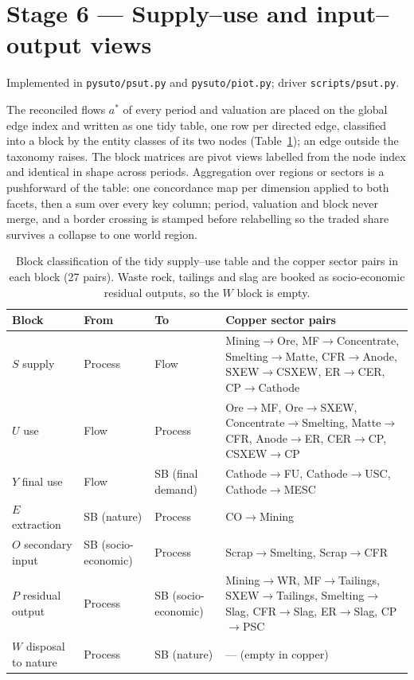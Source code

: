 \documentclass[11pt]{article}
\begin{document}
\section{Stage 6 --- Supply--use and input--output views}\label{si:stage6}
Implemented in \texttt{pysuto/psut.py} and \texttt{pysuto/piot.py}; driver
\texttt{scripts/psut.py}.

The reconciled flows $a^*$ of every period and valuation are placed on the
global edge index and written as one tidy table, one row per directed edge,
classified into a block by the entity classes of its two nodes
(Table~\ref{tab:si-blocks}); an edge outside the taxonomy raises. The block
matrices are pivot views labelled from the node index and identical in
shape across periods. Aggregation over regions or sectors is a pushforward
of the table: one concordance map per dimension applied to both facets, then
a sum over every key column; period, valuation and block never merge, and a
border crossing is stamped before relabelling so the traded share survives a
collapse to one world region.

\begin{table}[h]
\centering\small
\begin{tabular}{@{}llll@{}}
\toprule
Block & From & To & Copper sector pairs \\
\midrule
$S$ supply & Process & Flow & Mining$\to$Ore, MF$\to$Concentrate, Smelting$\to$Matte, CFR$\to$Anode, SXEW$\to$CSXEW, ER$\to$CER, CP$\to$Cathode \\
$U$ use & Flow & Process & Ore$\to$MF, Ore$\to$SXEW, Concentrate$\to$Smelting, Matte$\to$CFR, Anode$\to$ER, CER$\to$CP, CSXEW$\to$CP \\
$Y$ final use & Flow & SB (final demand) & Cathode$\to$FU, Cathode$\to$USC, Cathode$\to$MESC \\
$E$ extraction & SB (nature) & Process & CO$\to$Mining \\
$O$ secondary input & SB (socio-economic) & Process & Scrap$\to$Smelting, Scrap$\to$CFR \\
$P$ residual output & Process & SB (socio-economic) & Mining$\to$WR, MF$\to$Tailings, SXEW$\to$Tailings, Smelting$\to$Slag, CFR$\to$Slag, ER$\to$Slag, CP$\to$PSC \\
$W$ disposal to nature & Process & SB (nature) & --- (empty in copper) \\
\bottomrule
\end{tabular}
\caption{Block classification of the tidy supply--use table and the copper
sector pairs in each block (27 pairs). Waste rock, tailings and slag are
booked as socio-economic residual outputs, so the $W$ block is empty.}
\label{tab:si-blocks}
\end{table}
\end{document}

